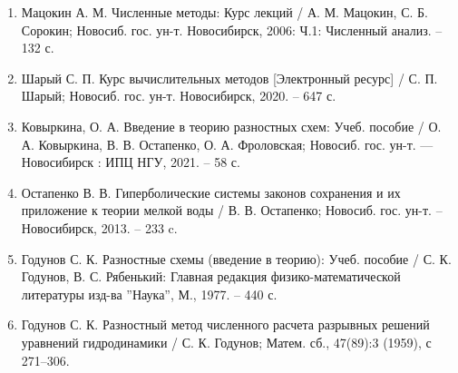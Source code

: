 \documentclass[../main.tex]{subfile}
\begin{document}
\begin{enumerate}[nosep]
	\item Мацокин А. М. Численные методы: Курс лекций / А. М. Мацокин,
		С. Б. Сорокин; Новосиб. гос. ун-т. Новосибирск, 2006: Ч.1:
		Численный анализ. -- 132 с.
	\item Шарый С. П. Курс вычислительных методов [Электронный ресурс] /
		С. П. Шарый; Новосиб. гос. ун-т. Новосибирск, 2020. -- 647 с.
	\item Ковыркина, О. А. Введение в теорию разностных схем: Учеб. пособие
		/ О. А. Ковыркина, В. В. Остапенко, О. А. Фроловская; Новосиб.
		гос. ун-т. --- Новосибирск : ИПЦ НГУ, 2021. -- 58 с.
	\item Остапенко В. В. Гиперболические системы законов сохранения и их
		приложение к теории мелкой воды / В. В. Остапенко; Новосиб. гос.
		ун-т. -- Новосибирск, 2013. -- 233 c.
	\item Годунов С. К. Разностные схемы (введение в теорию): Учеб. пособие /
		С. К. Годунов, В. С. Рябенький: Главная редакция
		физико-математической литературы изд-ва ''Наука'', М., 1977. --
		440 с.
	\item Годунов С. К. Разностный метод численного расчета разрывных
		решений уравнений гидродинамики / С. К. Годунов; Матем. сб.,
		47(89):3 (1959), с 271–306.
\end{enumerate}
\end{document}
